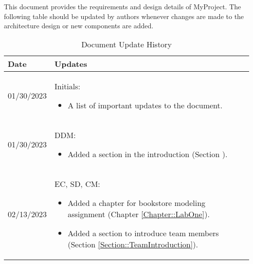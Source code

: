 This document provides the requirements and design details of MyProject.
The following table should be
updated by authors whenever changes are made to the architecture
design or new components are added.

\begin{longtable}{|l||p{13.5cm}|}
	\caption{Document Update History \label{Table::UpdateHistory}} \\
	\hline
	\textbf{Date} & \textbf{Updates}                               \\
	\hline
	\endhead

	01/30/2023    & Initials:
	\begin{itemize}[topsep=0pt,itemsep=0pt,parsep=0pt,partopsep=0pt,leftmargin=12pt]
		\item A list of important updates to the document.
	\end{itemize}
	\\ \hline

	01/30/2023    & DDM:
	\begin{itemize}[topsep=0pt,itemsep=0pt,parsep=0pt,partopsep=0pt,leftmargin=12pt]
		\item Added a section in the introduction (Section ). %
	\end{itemize}
	\\ \hline

	02/13/2023    & EC, SD, CM:
	\begin{itemize}[topsep=0pt,itemsep=0pt,parsep=0pt,partopsep=0pt,leftmargin=12pt]
		\item Added a chapter for bookstore modeling assignment (Chapter \ref{Chapter::LabOne}).
		\item Added a section to introduce team members (Section \ref{Section::TeamIntroduction}).
	\end{itemize}
	\\ \hline
\end{longtable}


